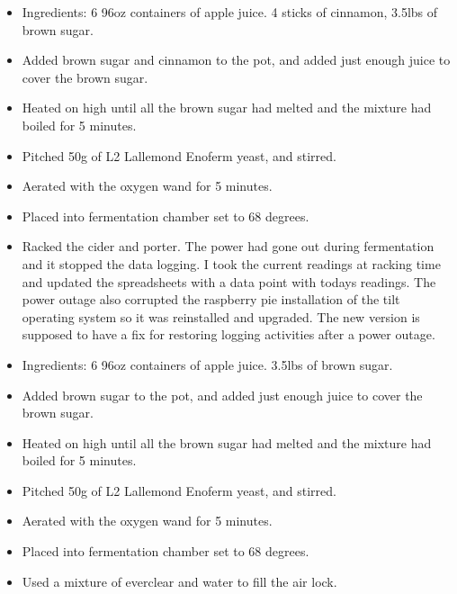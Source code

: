 \begin{itemize}
    \item Ingredients: 6 96oz containers of apple juice.  4 sticks of cinnamon, 3.5lbs of brown sugar.
    \item Added brown sugar and cinnamon to the pot, and added just enough juice to cover the brown sugar.
    \item Heated on high until all the brown sugar had melted and the mixture had boiled for 5 minutes.
    \item Pitched 50g of L2 Lallemond Enoferm yeast, and stirred.
    \item Aerated with the oxygen wand for 5 minutes.
    \item Placed into fermentation chamber set to 68 degrees.
\end{itemize}

\def\todaysdate{20200228}
\newday{\todaysdate}\label{\todaysdate}

\begin{itemize}
    \item Racked the cider and porter.  The power had gone out during fermentation and it stopped the data logging.  I took the current readings at racking time and updated the spreadsheets with a data point with todays readings.  The power outage also corrupted the raspberry pie installation of the tilt operating system so it was reinstalled and upgraded.  The new version is supposed to have a fix for restoring logging activities after a power outage.
\end{itemize}

\def\todaysdate{20200330}
\newday{\todaysdate}\label{\todaysdate}

\begin{itemize}
    \item Ingredients: 6 96oz containers of apple juice. 3.5lbs of brown sugar.
    \item Added brown sugar to the pot, and added just enough juice to cover the brown sugar.
    \item Heated on high until all the brown sugar had melted and the mixture had boiled for 5 minutes.
    \item Pitched 50g of L2 Lallemond Enoferm yeast, and stirred.
    \item Aerated with the oxygen wand for 5 minutes.
    \item Placed into fermentation chamber set to 68 degrees.
    \item Used a mixture of everclear and water to fill the air lock.
\end{itemize}

